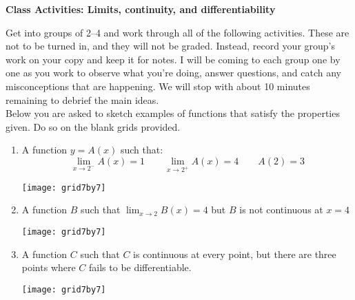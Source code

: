 \documentclass[11pt]{article}
\newcommand{\cuthere}{%
\noindent
\raisebox{-2.8pt}[0pt][0.75\baselineskip]{\small\ding{34}}
\unskip{\tiny\dotfill}
}
\begin{document}
	
	\thispagestyle{empty}
	\renewcommand{\headrulewidth}{0.0pt}
	\thispagestyle{fancy}
	\lfoot{}
	\cfoot{}
	\rfoot{}	
	
	\vspace*{0in}

		\begin{center}
			\begin{large}
			\textbf{Class Activities: Limits, continuity, and differentiability} \\
			\end{large}
		\end{center}
	
Get into groups of 2--4 and work through all of the following activities. These are not to be turned in, and they will not be graded. Instead, record your group's work on your copy and keep it for notes. I will be coming to each group one by one as you work to observe what you're doing, answer questions, and catch any misconceptions that are happening. We will stop with about 10 minutes remaining to debrief the main ideas. \\


Below you are asked to sketch examples of functions that satisfy the properties given. Do so on the blank grids provided. 

\begin{enumerate}
	\item A function $y= A(x)$ such that: 
	\[ \lim_{x \to 2^-} A(x) = 1 \qquad \lim_{x \to 2^+} A(x) = 4 \qquad A(2) = 3 \]
	
	\begin{center}
		\texttt{[image: grid7by7]}
	\end{center}
	
	\item A function $B$ such that $\lim_{x \to 2} B(x) = 4$ but $B$ is not continuous at $x=4$ 
	
	\begin{center}
		\texttt{[image: grid7by7]}
	\end{center}
	
	\item A function $C$ such that $C$ is continuous at every point, but there are three points where $C$ fails to be differentiable. 
	
	\begin{center}
		\texttt{[image: grid7by7]}
	\end{center}
\end{enumerate}




% 
% 
% 
\end{document}
